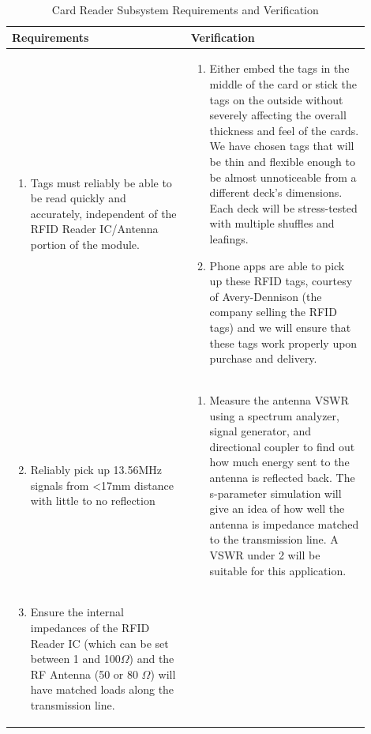 \documentclass[12pt]{article}
\begin{document}
\begin{table}[!h]
	\caption{Card Reader Subsystem Requirements and Verification}
	\label{tab:card_rv}
	\centering
	\begin{tabular}{| p{0.45\linewidth} | p{0.45\linewidth} |} 
 		\hline
 		\textbf{Requirements} & \textbf{Verification} \\ 
 		\hline
 		\begin{enumerate}
 			\item Tags must reliably be able to be read quickly and accurately, independent of the RFID Reader IC/Antenna portion of the module.
		\end{enumerate} & \begin{enumerate}[label=\alph*)]
 			\item Either embed the tags in the middle of the card or stick the tags on the outside without severely affecting the overall thickness and feel of the cards. We have chosen tags that will be thin and flexible enough to be almost unnoticeable from a different deck's dimensions. Each deck will be stress-tested with multiple shuffles and leafings.
 			\item Phone apps are able to pick up these RFID tags, courtesy of Avery-Dennison (the company selling the RFID tags) and we will ensure that these tags work properly upon purchase and delivery.
		\end{enumerate} \\
		\hline
		\begin{enumerate}
		\setcounter{enumi}{1}
 			\item Reliably pick up 13.56MHz signals from <17mm distance with little to no reflection
		\end{enumerate} & \begin{enumerate}[label=\alph*)]
 			\item Measure the antenna VSWR using a spectrum analyzer, signal generator, and directional coupler to find out how much energy sent to the antenna is reflected back. The s-parameter simulation will give an idea of how well the antenna is impedance matched to the transmission line. A VSWR under 2 will be suitable for this application.
		\end{enumerate} \\
		\hline
		\begin{enumerate}
		\setcounter{enumi}{2}
 			\item Ensure the internal impedances of the RFID Reader IC (which can be set between 1 and 100$\Omega$) and the RF Antenna (50 or 80 $\Omega$) will have matched loads along the transmission line.

\end{enumerate}
\end{tabular}
\end{table}
\end{document}
